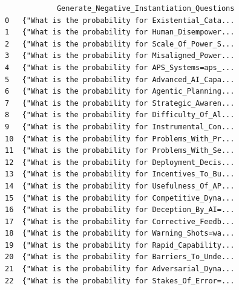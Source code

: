 \documentclass[
  11pt,
  letterpaper,
]{book}
\begin{document}
\begin{verbatim}
            Generate_Negative_Instantiation_Questions  
0   {"What is the probability for Existential_Cata...  
1   {"What is the probability for Human_Disempower...  
2   {"What is the probability for Scale_Of_Power_S...  
3   {"What is the probability for Misaligned_Power...  
4   {"What is the probability for APS_Systems=aps_...  
5   {"What is the probability for Advanced_AI_Capa...  
6   {"What is the probability for Agentic_Planning...  
7   {"What is the probability for Strategic_Awaren...  
8   {"What is the probability for Difficulty_Of_Al...  
9   {"What is the probability for Instrumental_Con...  
10  {"What is the probability for Problems_With_Pr...  
11  {"What is the probability for Problems_With_Se...  
12  {"What is the probability for Deployment_Decis...  
13  {"What is the probability for Incentives_To_Bu...  
14  {"What is the probability for Usefulness_Of_AP...  
15  {"What is the probability for Competitive_Dyna...  
16  {"What is the probability for Deception_By_AI=...  
17  {"What is the probability for Corrective_Feedb...  
18  {"What is the probability for Warning_Shots=wa...  
19  {"What is the probability for Rapid_Capability...  
20  {"What is the probability for Barriers_To_Unde...  
21  {"What is the probability for Adversarial_Dyna...  
22  {"What is the probability for Stakes_Of_Error=...  
\end{verbatim}
\end{document}
